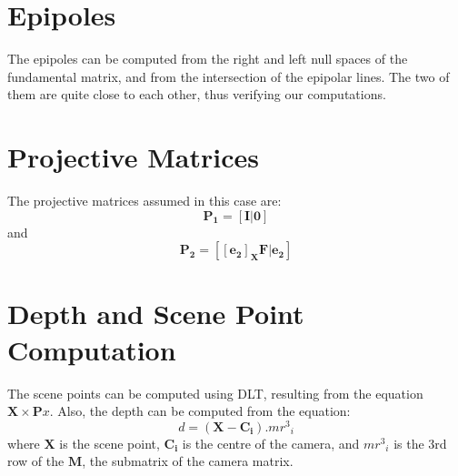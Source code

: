 \documentclass[]{article}
\begin{document}
\section{Epipoles}
The epipoles can be computed from the right and left null spaces of the fundamental matrix,
and from the intersection of the epipolar lines. The two of them are quite close to each other,
thus verifying our computations.

\section{Projective Matrices}
The projective matrices assumed in this case are:
\begin{equation}
  \mathbf{P_1} = [ \mathbf{I} | \mathbf{0} ]
\end{equation}
and
\begin{equation}
  \mathbf{P_2} = [ \mathbf{[e_2]_X} \mathbf{F} | \mathbf{e_2} ]
\end{equation}

\section{Depth and Scene Point Computation}
The scene points can be computed using DLT, resulting from the equation
$\mathbf{X} \times \mathbf{P} x$. Also, the depth can be computed from
the equation:
\begin{equation}
  d = \left( \mathbf{X} - \mathbf{C_i} \right) . {mr^3}_i
\end{equation}
where $\mathbf{X}$ is the scene point, $\mathbf{C_i}$ is the centre of the camera,
and ${mr^3}_i$ is the 3rd row of the $\mathbf{M}$, the submatrix of the camera matrix.
\end{document}
